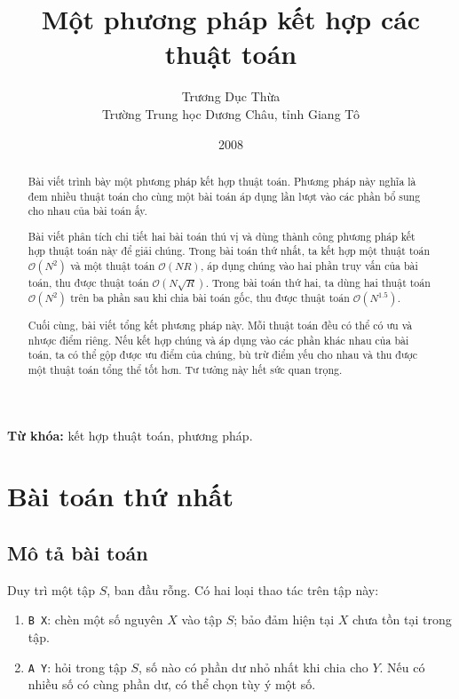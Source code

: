 \documentclass[11pt]{article}
\title{Một phương pháp kết hợp các thuật toán}
\author{Trương Dục Thừa\\Trường Trung học Dương Châu, tỉnh Giang Tô}
\date{2008}
\newcommand{\Oh}{\mathcal{O}}
\begin{document}
\maketitle


\begin{abstract}
Bài viết trình bày một phương pháp kết hợp thuật toán. Phương pháp này nghĩa
là đem nhiều thuật toán cho cùng một bài toán áp dụng lần lượt vào các phần
bổ sung cho nhau của bài toán ấy.

Bài viết phân tích chi tiết hai bài toán thú vị và dùng thành công phương
pháp kết hợp thuật toán này để giải chúng. Trong bài toán thứ nhất, ta kết
hợp một thuật toán $\Oh(N^2)$ và một thuật toán $\Oh(NR)$, áp dụng chúng vào
hai phần truy vấn của bài toán, thu được thuật toán $\Oh(N\sqrt{R})$. Trong
bài toán thứ hai, ta dùng hai thuật toán $\Oh(N^2)$ trên ba phần sau khi chia
bài toán gốc, thu được thuật toán $\Oh(N^{1.5})$.

Cuối cùng, bài viết tổng kết phương pháp này. Mỗi thuật toán đều có thể có ưu
và nhược điểm riêng. Nếu kết hợp chúng và áp dụng vào các phần khác nhau của
bài toán, ta có thể gộp được ưu điểm của chúng, bù trừ điểm yếu cho nhau và
thu được một thuật toán tổng thể tốt hơn. Tư tưởng này hết sức quan trọng.
\end{abstract}

\noindent\textbf{Từ khóa:} kết hợp thuật toán, phương pháp.

\section{Bài toán thứ nhất}

\subsection{Mô tả bài toán}

Duy trì một tập $S$, ban đầu rỗng. Có hai loại thao tác trên tập này:
\begin{enumerate}
  \item \texttt{B X}: chèn một số nguyên $X$ vào tập $S$; bảo đảm hiện tại
  $X$ chưa tồn tại trong tập.
  \item \texttt{A Y}: hỏi trong tập $S$, số nào có phần dư nhỏ nhất khi chia
  cho $Y$. Nếu có nhiều số có cùng phần dư, có thể chọn tùy ý một số.
\end{enumerate}
\end{document}
